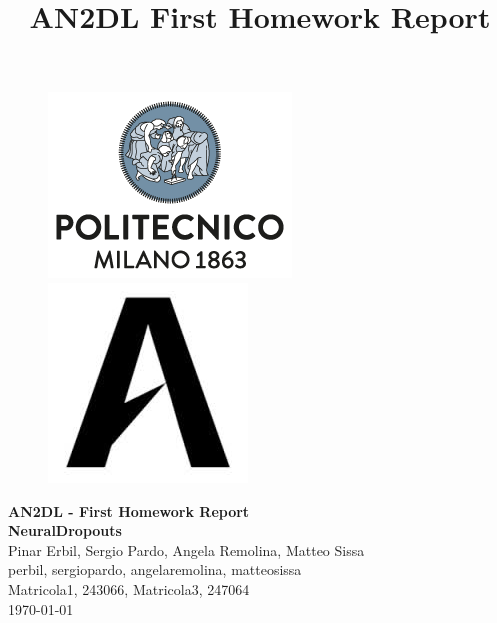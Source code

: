 \documentclass[11pt]{article}
\title{AN2DL First Homework Report}
\begin{document}
    
    \begin{figure}[H]
        \raggedright
        \includegraphics[scale=0.4]{polimi.png} \hfill \includegraphics[scale=0.3]{airlab.jpeg}
    \end{figure}
    
    \vspace{5mm}
    
    \begin{center}
        {\Large \textbf{AN2DL - First Homework Report}}\\
        \vspace{2mm}
        {\Large \textbf{NeuralDropouts}}\\
        \vspace{2mm}
        {\large Pinar Erbil,}
        {\large Sergio Pardo,}
        {\large Angela Remolina,}
        {\large Matteo Sissa}\\
        \vspace{2mm}
        {perbil,}
        {sergiopardo,}
        {angelaremolina,}
        {matteosissa}\\
        \vspace{2mm}
        {Matricola1,}
        {243066,}
        {Matricola3,}
        {247064}\\
        \vspace{5mm}
        \today
    \end{center}    
    \vspace{5mm}
    
\end{document}
